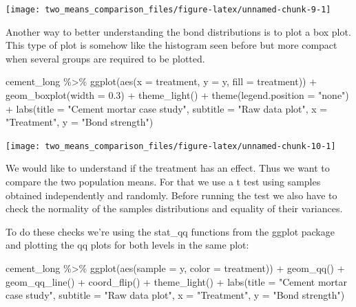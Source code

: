\documentclass[
]{book}
\newenvironment{Shaded}{\begin{snugshade}}{\end{snugshade}}
\newcommand{\AttributeTok}[1]{\textcolor[rgb]{0.77,0.63,0.00}{#1}}
\newcommand{\FloatTok}[1]{\textcolor[rgb]{0.00,0.00,0.81}{#1}}
\newcommand{\FunctionTok}[1]{\textcolor[rgb]{0.00,0.00,0.00}{#1}}
\newcommand{\NormalTok}[1]{#1}
\newcommand{\SpecialCharTok}[1]{\textcolor[rgb]{0.00,0.00,0.00}{#1}}
\newcommand{\StringTok}[1]{\textcolor[rgb]{0.31,0.60,0.02}{#1}}
\begin{document}
\texttt{[image: two\_means\_comparison\_files/figure-latex/unnamed-chunk-9-1]}

Another way to better understanding the bond distributions is to plot a box plot. This type of plot is somehow like the histogram seen before but more compact when several groups are required to be plotted.

\begin{Shaded}
\begin{Highlighting}[]
\NormalTok{cement\_long }\SpecialCharTok{\%\textgreater{}\%} 
  \FunctionTok{ggplot}\NormalTok{(}\FunctionTok{aes}\NormalTok{(}\AttributeTok{x =}\NormalTok{ treatment, }\AttributeTok{y =}\NormalTok{ y, }\AttributeTok{fill =}\NormalTok{ treatment)) }\SpecialCharTok{+}
  \FunctionTok{geom\_boxplot}\NormalTok{(}\AttributeTok{width =} \FloatTok{0.3}\NormalTok{) }\SpecialCharTok{+}
  \FunctionTok{theme\_light}\NormalTok{() }\SpecialCharTok{+}
  \FunctionTok{theme}\NormalTok{(}\AttributeTok{legend.position =} \StringTok{"none"}\NormalTok{) }\SpecialCharTok{+}
  \FunctionTok{labs}\NormalTok{(}\AttributeTok{title =} \StringTok{"Cement mortar case study"}\NormalTok{,}
       \AttributeTok{subtitle =} \StringTok{"Raw data plot"}\NormalTok{,}
       \AttributeTok{x =} \StringTok{"Treatment"}\NormalTok{,}
       \AttributeTok{y =} \StringTok{"Bond strength"}\NormalTok{)}
\end{Highlighting}
\end{Shaded}

\texttt{[image: two\_means\_comparison\_files/figure-latex/unnamed-chunk-10-1]}

We would like to understand if the treatment has an effect. Thus we want to compare the two population means. For that we use a t test using samples obtained independently and randomly. Before running the test we also have to check the normality of the samples distributions and equality of their variances.

To do these checks we're using the stat\_qq functions from the ggplot package and plotting the qq plots for both levels in the same plot:

\begin{Shaded}
\begin{Highlighting}[]
\NormalTok{cement\_long }\SpecialCharTok{\%\textgreater{}\%}
  \FunctionTok{ggplot}\NormalTok{(}\FunctionTok{aes}\NormalTok{(}\AttributeTok{sample =}\NormalTok{ y, }\AttributeTok{color =}\NormalTok{ treatment)) }\SpecialCharTok{+}
  \FunctionTok{geom\_qq}\NormalTok{() }\SpecialCharTok{+}
  \FunctionTok{geom\_qq\_line}\NormalTok{() }\SpecialCharTok{+}
  \FunctionTok{coord\_flip}\NormalTok{() }\SpecialCharTok{+}
  \FunctionTok{theme\_light}\NormalTok{() }\SpecialCharTok{+}
  \FunctionTok{labs}\NormalTok{(}\AttributeTok{title =} \StringTok{"Cement mortar case study"}\NormalTok{,}
       \AttributeTok{subtitle =} \StringTok{"Raw data plot"}\NormalTok{,}
       \AttributeTok{x =} \StringTok{"Treatment"}\NormalTok{,}
       \AttributeTok{y =} \StringTok{"Bond strength"}\NormalTok{)}
\end{Highlighting}
\end{Shaded}
\end{document}
